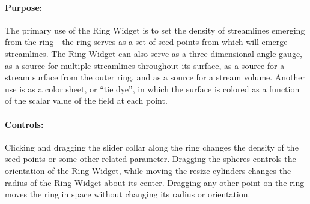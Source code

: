 \paragraph{Purpose:} The primary use of the Ring Widget is to set the
density of streamlines emerging from the ring---the ring serves as a set of
seed points from which will emerge streamlines.  The Ring Widget can also
serve as a three-dimensional angle gauge, as a source for multiple
streamlines throughout its surface, as a source for a stream surface from
the outer ring, and as a source for a stream volume.  Another use is as a
color sheet, or ``tie dye'', in which the surface is colored as a function of
the scalar value of the field at each point.

\paragraph{Controls: } Clicking and dragging the slider collar along the
ring changes the density of the seed points or some other related
parameter.  Dragging the spheres controls the orientation of the Ring
Widget, while moving the resize cylinders changes the radius of the Ring
Widget about its center.  Dragging any other point on the ring moves the
ring in space without changing its radius or orientation.

